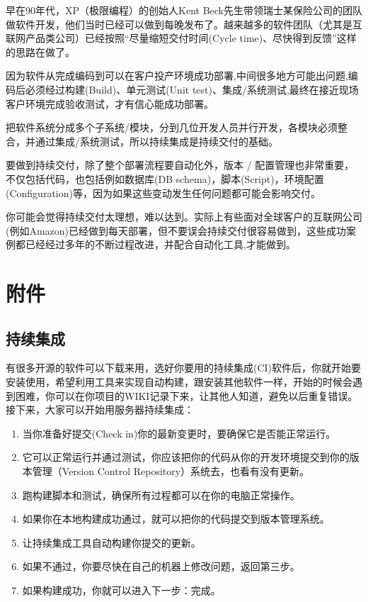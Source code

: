 早在90年代，XP（极限编程）的创始人Kent
Beck先生带领瑞士某保险公司的团队做软件开发，他们当时已经可以做到每晚发布了。越来越多的软件团队（尤其是互联网产品类公司）已经按照``尽量缩短交付时间(Cycle
time)、尽快得到反馈''这样的思路在做了。

因为软件从完成编码到可以在客户投产环境成功部署,中间很多地方可能出问题,编码后必须经过构建(Build)、单元测试(Unit
test)、集成/系统测试,最终在接近现场客户环境完成验收测试，才有信心能成功部署。

把软件系统分成多个子系统/模块，分到几位开发人员并行开发，各模块必须整合，并通过集成/系统测试，所以持续集成是持续交付的基础。

要做到持续交付，除了整个部署流程要自动化外，版本 /
配置管理也非常重要，不仅包括代码，也包括例如数据库(DB
schema)，脚本(Script)，环境配置(Configuration)等，因为如果这些变动发生任何问题都可能会影响交付。

你可能会觉得持续交付太理想，难以达到。实际上有些面对全球客户的互联网公司(例如Amazon)已经做到每天部署，但不要误会持续交付很容易做到，这些成功案例都已经经过多年的不断过程改进，并配合自动化工具,才能做到。

\hypertarget{ux9644ux4ef6}{%
\section{附件}\label{ux9644ux4ef6}}

\hypertarget{ux6301ux7eedux96c6ux6210-1}{%
\subsection{持续集成}\label{ux6301ux7eedux96c6ux6210-1}}

有很多开源的软件可以下载来用，选好你要用的持续集成(CI)软件后，你就开始要安装使用，希望利用工具来实现自动构建，跟安装其他软件一样，开始的时候会遇到困难，你可以在你项目的WIKI记录下来，让其他人知道，避免以后重复错误。接下来，大家可以开始用服务器持续集成：

\begin{enumerate}
\tightlist
\item
  当你准备好提交(Check in)你的最新变更时，要确保它是否能正常运行。
\item
  它可以正常运行并通过测试，你应该把你的代码从你的开发环境提交到你的版本管理（Version
  Control Repository）系统去，也看有没有更新。
\item
  跑构建脚本和测试，确保所有过程都可以在你的电脑正常操作。
\item
  如果你在本地构建成功通过，就可以把你的代码提交到版本管理系统。
\item
  让持续集成工具自动构建你提交的更新。
\item
  如果不通过，你要尽快在自己的机器上修改问题，返回第三步。
\item
  如果构建成功，你就可以进入下一步：完成。
\end{enumerate}

